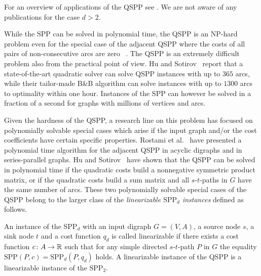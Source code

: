 For an overview of applications of the QSPP see \cite{huSo2020,rostami2018}.
We are not  aware of any
publications  
for the case $d>2$.


While the SPP can be solved in polynomial time, the QSPP is an NP-hard
problem even for the special case of the adjacent QSPP where  the  costs of all pairs of non-consecutive  arcs are  
zero ~\cite{rostami2018}.
The QSPP is  an  extremely difficult
problem also from the practical point of view.  
 Hu and Sotirov~\cite{huSo2020} report that a state-of-the-art quadratic solver can
solve QSPP instances with up to $365$ arcs, while their  tailor-made B\&B
algorithm can solve instances with up to $1300$ arcs to optimality within one  hour. 
Instances of the SPP can however be solved in a fraction of a second for graphs with
millions of vertices and arcs.

\smallskip

Given the 
hardness of the QSPP, a research line on this problem has focused
on 
polynomially solvable special cases which
arise if the input graph and/or the cost coefficients have certain specific
properties. Rostami et al.~\cite{rostami2015} have presented a polynomial time
algorithm for the adjacent QSPP in acyclic digraphs and in series-parallel graphs. Hu 
and Sotirov~\cite{huSo2018}
have shown that the QSPP can be solved in polynomial time if the  quadratic
costs build a  nonnegative symmetric product matrix, or if the quadratic costs
build a sum matrix and all $s$-$t$-paths in 
$G$ have the same number of arcs. 
These two polynomially solvable
special cases of the QSPP belong to the larger class of the \emph{linearizable $\text{SPP}_d$ instances} defined as follows.
\begin{definition}
\label{def:linearizable}
 An instance of the SPP$_d$ with an input digraph $G=(V,A)$, a source node $s$, a sink node $t$
 and a  cost function $q_d$ is called linearizable if there exists a cost function
 $c\colon A\to \mathbb{R}$ such that for any simple directed $s$-$t$-path  $P$ in $G$ the equality
 $\text{SPP}(P,c) = \text{SPP}_d(P,q_d)$ holds.
  A linearizable instance  of the  QSPP is a linearizable instance of the $\text{SPP}_2$.
\end{definition}

